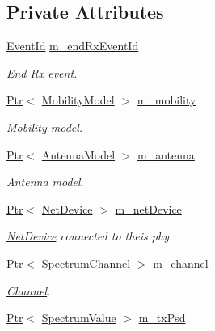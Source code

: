 \subsection*{Private Attributes}
\begin{DoxyCompactItemize}
\item 
\hyperlink{classns3_1_1EventId}{Event\+Id} \hyperlink{classns3_1_1HalfDuplexIdealPhy_a9d4b5b6524f54eb2c36dff8212ad99b4}{m\+\_\+end\+Rx\+Event\+Id}
\begin{DoxyCompactList}\small\item\em End Rx event. \end{DoxyCompactList}\item 
\hyperlink{classns3_1_1Ptr}{Ptr}$<$ \hyperlink{classns3_1_1MobilityModel}{Mobility\+Model} $>$ \hyperlink{classns3_1_1HalfDuplexIdealPhy_a4473d14e6f2ff9983cb9c5eee0b52fe7}{m\+\_\+mobility}
\begin{DoxyCompactList}\small\item\em Mobility model. \end{DoxyCompactList}\item 
\hyperlink{classns3_1_1Ptr}{Ptr}$<$ \hyperlink{classns3_1_1AntennaModel}{Antenna\+Model} $>$ \hyperlink{classns3_1_1HalfDuplexIdealPhy_a4f2f0f4e0c74e5dadd3dd775768e5195}{m\+\_\+antenna}
\begin{DoxyCompactList}\small\item\em Antenna model. \end{DoxyCompactList}\item 
\hyperlink{classns3_1_1Ptr}{Ptr}$<$ \hyperlink{classns3_1_1NetDevice}{Net\+Device} $>$ \hyperlink{classns3_1_1HalfDuplexIdealPhy_aaa6f5f1e7154d0cd2aada4fd79cdddda}{m\+\_\+net\+Device}
\begin{DoxyCompactList}\small\item\em \hyperlink{classns3_1_1NetDevice}{Net\+Device} connected to theis phy. \end{DoxyCompactList}\item 
\hyperlink{classns3_1_1Ptr}{Ptr}$<$ \hyperlink{classns3_1_1SpectrumChannel}{Spectrum\+Channel} $>$ \hyperlink{classns3_1_1HalfDuplexIdealPhy_a9bb6049f9f9ff30db2f243eef2fe78d8}{m\+\_\+channel}
\begin{DoxyCompactList}\small\item\em \hyperlink{classns3_1_1Channel}{Channel}. \end{DoxyCompactList}\item 
\hyperlink{classns3_1_1Ptr}{Ptr}$<$ \hyperlink{classns3_1_1SpectrumValue}{Spectrum\+Value} $>$ \hyperlink{classns3_1_1HalfDuplexIdealPhy_aec3b3404be2ce3e803e134e27a79aae9}{m\+\_\+tx\+Psd}

\end{DoxyCompactItemize}
